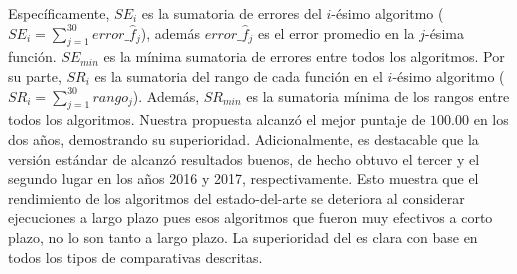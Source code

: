 Específicamente, $SE_i$ es la sumatoria de errores del $i$-ésimo algoritmo ($SE_i = \sum_{j=1}^{30} error\_\hat{f}_j$), además $error\_\hat{f}_j$ es el error promedio en la $j$-ésima función.
%
$SE_{min}$ es la mínima sumatoria de errores entre todos los algoritmos.
%
Por su parte, $SR_i$ es la sumatoria del rango de cada función en el $i$-ésimo algoritmo ($SR_i = \sum_{j=1}^{30} rango_j$). %
%
Además, $SR_{min}$ es la sumatoria mínima de los rangos entre todos los algoritmos. %
%
Nuestra propuesta alcanzó el mejor puntaje de $100.00$ en los dos años, demostrando su superioridad. 
%
Adicionalmente, es destacable que la versión estándar de \DE{} alcanzó resultados buenos, de hecho obtuvo el tercer y el segundo lugar en los años 2016 y 2017, respectivamente.
%
Esto muestra que el rendimiento de los algoritmos del estado-del-arte se deteriora al considerar 
ejecuciones a largo plazo pues esos algoritmos que fueron muy efectivos a corto plazo,
no lo son tanto a largo plazo.
%
%
%
La superioridad del \DEEDM{} es clara con base en todos los tipos de comparativas descritas.

